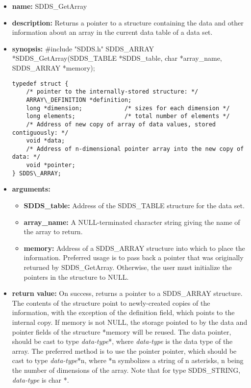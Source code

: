 \documentclass[11pt]{article}
\begin{document}
\begin{itemize}
\item {\bf name:}\newline
SDDS\_GetArray
\item {\bf description:}\newline
Returns a pointer to a structure containing the data and other information about an array in the current data table of a data set.
\item {\bf synopsis:} \#include "SDDS.h"\newline
SDDS\_ARRAY *SDDS\_GetArray(SDDS\_TABLE *SDDS\_table, char *array\_name, SDDS\_ARRAY *memory);\newline
\begin{verbatim}
typedef struct {
    /* pointer to the internally-stored structure: */
    ARRAY\_DEFINITION *definition; 
    long *dimension;            /* sizes for each dimension */
    long elements;              /* total number of elements */
    /* Address of new copy of array of data values, stored contiguously: */
    void *data;
    /* Address of n-dimensional pointer array into the new copy of data: */
    void *pointer;
} SDDS\_ARRAY;
\end{verbatim}
\item {\bf arguments:}
\begin{itemize}
\item {\bf SDDS\_table:} Address of the SDDS\_TABLE structure for the data set.
\item {\bf array\_name:} A NULL-terminated character string giving the name of the array to return.
\item {\bf memory:} Address of a SDDS\_ARRAY structure into which to place the information. Preferred usage is to pass back a pointer that was originally returned by SDDS\_GetArray. Otherwise, the user must initialize the pointers in the structure to NULL.
\end{itemize}
\item {\bf return value:}\newline
On success, returns a pointer to a SDDS\_ARRAY structure. The contents of the structure point to newly-created copies of the information, with the exception of the  definition field, which points to the internal copy. If  memory is not NULL, the storage pointed to by the  data and  pointer fields of the structure  *memory will be reused. The  data pointer, should be cast to type {\em data-type}*, where {\em data-type} is the data type of the array. The preferred method is to use the  pointer pointer, which should be cast to type {\em data-type}*n, where *n symbolizes a string of n asterisks, n being the number of dimensions of the array. Note that for type SDDS\_STRING, {\em data-type} is char *.\newline

\end{itemize}
\end{document}
